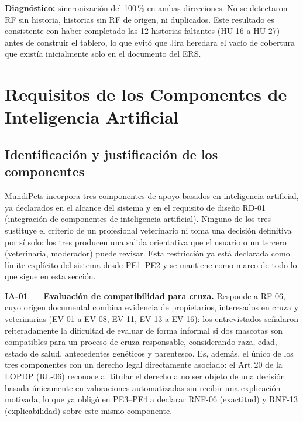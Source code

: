\documentclass[journal,onecolumn]{IEEEtran}
\begin{document}
\noindent\textbf{Diagnóstico:} sincronización del 100\,\% en ambas
direcciones. No se detectaron RF sin historia, historias sin RF de
origen, ni duplicados. Este resultado es consistente con haber
completado las 12 historias faltantes (HU-16 a HU-27) antes de construir
el tablero, lo que evitó que Jira heredara el vacío de cobertura que
existía inicialmente solo en el documento del ERS.
	
	\newpage
	
	\section{Requisitos de los Componentes de Inteligencia Artificial}
\label{sec:requisitos_ia}

\subsection{Identificación y justificación de los componentes}

MundiPets incorpora tres componentes de apoyo basados en inteligencia artificial, ya
declarados en el alcance del sistema y en el requisito de diseño RD-01 (integración de
componentes de inteligencia artificial). Ninguno de los tres sustituye el criterio de un
profesional veterinario ni toma una decisión definitiva por sí solo: los tres producen una
salida orientativa que el usuario o un tercero (veterinaria, moderador) puede revisar. Esta
restricción ya está declarada como límite explícito del sistema desde PE1--PE2 y se mantiene
como marco de todo lo que sigue en esta sección.

\textbf{IA-01 --- Evaluación de compatibilidad para cruza.} Responde a RF-06, cuyo origen
documental combina evidencia de propietarios, interesados en cruza y veterinarias (EV-01 a
EV-08, EV-11, EV-13 a EV-16): los entrevistados señalaron reiteradamente la dificultad de
evaluar de forma informal si dos mascotas son compatibles para un proceso de cruza responsable,
considerando raza, edad, estado de salud, antecedentes genéticos y parentesco. Es, además, el
único de los tres componentes con un derecho legal directamente asociado: el Art.\,20 de la
LOPDP (RL-06) reconoce al titular el derecho a no ser objeto de una decisión basada únicamente
en valoraciones automatizadas sin recibir una explicación motivada, lo que ya obligó en PE3--PE4
a declarar RNF-06 (exactitud) y RNF-13 (explicabilidad) sobre este mismo componente.
\end{document}
